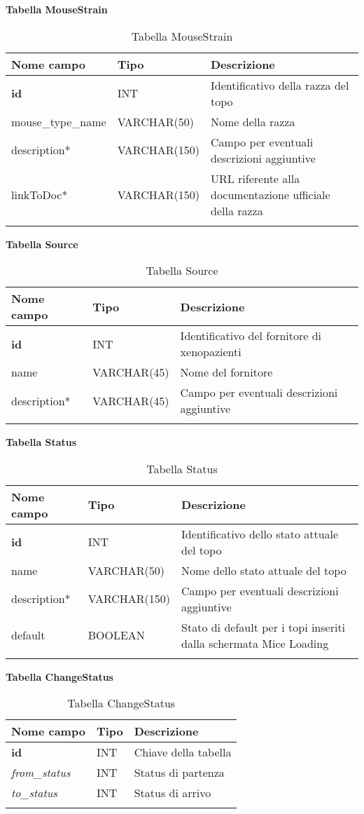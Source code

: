 \textbf{Tabella MouseStrain}

\begin{longtable}{|l|l|p{5.5cm}|}
\hline
\textbf{Nome campo} &	\textbf{Tipo} &	\textbf{Descrizione}\\ \hline
\textbf{id} &	INT &	Identificativo della razza del topo\\ \hline
mouse\_type\_name &	VARCHAR(50) &	Nome della razza\\ \hline
description* &	VARCHAR(150) &	Campo per eventuali descrizioni aggiuntive\\ \hline
linkToDoc* &	VARCHAR(150) & URL riferente alla documentazione ufficiale della razza\\ \hline
\caption{Tabella MouseStrain}
\end{longtable}

\textbf{Tabella Source}

\begin{longtable}{|l|l|p{5.5cm}|}
\hline
\textbf{Nome campo} &	\textbf{Tipo} &	\textbf{Descrizione}\\ \hline
\textbf{id} &	INT &	Identificativo del fornitore di xenopazienti\\ \hline
name &	VARCHAR(45) &	Nome del fornitore\\ \hline
description* &	VARCHAR(45) &	Campo per eventuali descrizioni aggiuntive\\ \hline
\caption{Tabella Source}
\end{longtable}


\textbf{Tabella Status}

\begin{longtable}{|l|l|p{6.2cm}|}
\hline
\textbf{Nome campo} &	\textbf{Tipo} &	\textbf{Descrizione}\\ \hline
\textbf{id} &	INT &	Identificativo dello stato attuale del topo\\ \hline
name &	VARCHAR(50) &	Nome dello stato attuale del topo\\ \hline
description* &	VARCHAR(150) &	Campo per eventuali descrizioni aggiuntive\\ \hline
default &	BOOLEAN &	Stato di default per i topi inseriti dalla schermata Mice Loading\\ \hline
\caption{Tabella Status}
\end{longtable}

\textbf{Tabella ChangeStatus}

\begin{longtable}{|l|l|p{5.5cm}|}
\hline
\textbf{Nome campo} &	\textbf{Tipo} &	\textbf{Descrizione}\\ \hline
\textbf{id} & INT & Chiave della tabella\\ \hline
\textit{from\_status} & INT & Status di partenza\\ \hline
\textit{to\_status} & INT & Status di arrivo\\ \hline
\caption{Tabella ChangeStatus}
\end{longtable}


